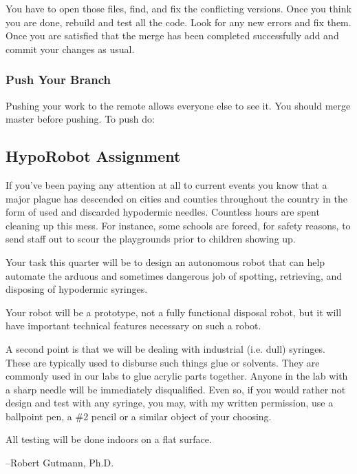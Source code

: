  You have to open those files, find, and fix the conflicting versions. Once you think you are done, rebuild and test all the code. Look for any new errors and fix them. Once you are satisfied that the merge has been completed successfully add and commit your changes as usual.\hypertarget{index_autotoc_md6}{}\subsubsection{Push Your Branch}\label{index_autotoc_md6}
Pushing your work to the remote allows everyone else to see it. You should merge master before pushing. To push do\+: 
\begin{DoxyCode}{0}
\end{DoxyCode}
\hypertarget{index_autotoc_md7}{}\subsection{Hypo\+Robot Assignment}\label{index_autotoc_md7}
If you’ve been paying any attention at all to current events you know that a major plague has descended on cities and counties throughout the country in the form of used and discarded hypodermic needles. Countless hours are spent cleaning up this mess. For instance, some schools are forced, for safety reasons, to send staff out to scour the playgrounds prior to children showing up.

Your task this quarter will be to design an autonomous robot that can help automate the arduous and sometimes dangerous job of spotting, retrieving, and disposing of hypodermic syringes.

Your robot will be a prototype, not a fully functional disposal robot, but it will have important technical features necessary on such a robot.

A second point is that we will be dealing with industrial (i.\+e. dull) syringes. These are typically used to disburse such things glue or solvents. They are commonly used in our labs to glue acrylic parts together. Anyone in the lab with a sharp needle will be immediately disqualified. Even so, if you would rather not design and test with any syringe, you may, with my written permission, use a ballpoint pen, a \#2 pencil or a similar object of your choosing.

All testing will be done indoors on a flat surface.

--Robert Gutmann, Ph.\+D. 